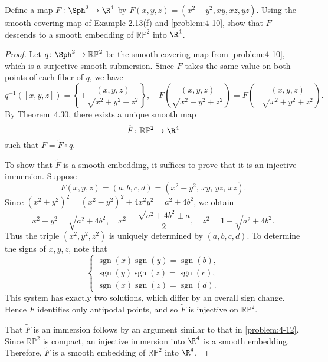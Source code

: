 \begin{problem}
    Define a map $F \colon \Sph^2 \to \R^4$ by $F(x,y,z) = (x^2 - y^2, xy, xz, yz)$. 
    Using the smooth covering map of Example 2.13(f) and \cref{problem:4-10}, show that $F$ descends to a smooth embedding of $\mathbb{RP}^2$ into $\R^4$.
    \begin{proof}
    Let $q \colon \Sph^2 \to \mathbb{RP}^2$ be the smooth covering map from \cref{problem:4-10}, which is a surjective smooth submersion. Since $F$ takes the same value on both points of each fiber of $q$, we have
    \[
    q^{-1}([x,y,z]) = \left\{ \pm \frac{(x,y,z)}{\sqrt{x^2+y^2+z^2}} \right\}, 
    \quad 
    F\!\left(\frac{(x,y,z)}{\sqrt{x^2+y^2+z^2}}\right) 
    = F\!\left(-\frac{(x,y,z)}{\sqrt{x^2+y^2+z^2}}\right).
    \]
    By Theorem~4.30, there exists a unique smooth map 
    \[
    \widetilde{F} \colon \mathbb{RP}^2 \to \R^4
    \]
    such that $F = \widetilde{F} \circ q$.

    To show that $\widetilde{F}$ is a smooth embedding, it suffices to prove that it is an injective immersion. Suppose
    \[
    F(x,y,z) = (a,b,c,d) = (x^2 - y^2, \, xy, \, yz, \, xz).
    \]
    Since $(x^2+y^2)^2 = (x^2 - y^2)^2 + 4x^2y^2 = a^2 + 4b^2$, we obtain
    \[
    x^2 + y^2 = \sqrt{a^2 + 4b^2}, 
    \quad 
    x^2 = \frac{\sqrt{a^2+4b^2} \pm a}{2}, 
    \quad 
    z^2 = 1 - \sqrt{a^2+4b^2}.
    \]
    Thus the triple $(x^2,y^2,z^2)$ is uniquely determined by $(a,b,c,d)$. To determine the signs of $x,y,z$, note that
    \[
    \begin{cases}
    \operatorname{sgn}(x)\operatorname{sgn}(y) = \operatorname{sgn}(b),\\[6pt]
    \operatorname{sgn}(y)\operatorname{sgn}(z) = \operatorname{sgn}(c),\\[6pt]
    \operatorname{sgn}(x)\operatorname{sgn}(z) = \operatorname{sgn}(d).
    \end{cases}
    \]
    This system has exactly two solutions, which differ by an overall sign change. Hence $F$ identifies only antipodal points, and so $\widetilde{F}$ is injective on $\mathbb{RP}^2$.

    That $\widetilde{F}$ is an immersion follows by an argument similar to that in \cref{problem:4-12}. Since $\mathbb{RP}^2$ is compact, an injective immersion into $\R^4$ is a smooth embedding. Therefore, $\widetilde{F}$ is a smooth embedding of $\mathbb{RP}^2$ into $\R^4$.
    \end{proof}
\end{problem}